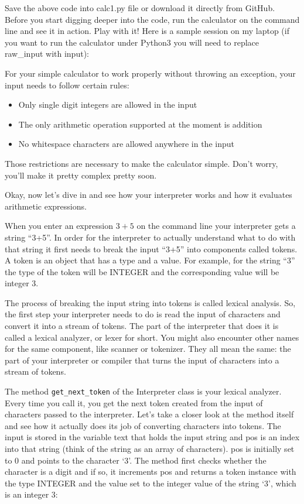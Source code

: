 Save the above code into calc1.py file or download it directly from GitHub.
Before you start digging deeper into the code, run the calculator on the command
line and see it in action. Play with it! Here is a sample session on my laptop
(if you want to run the calculator under Python3 you will need to replace
raw\_input with input):

For your simple calculator to work properly without throwing an exception, your
input needs to follow certain rules:
\begin{itemize}[nosep]
  \item 
Only single digit integers are allowed in the input
  \item 
The only arithmetic operation supported at the moment is addition
  \item 
No whitespace characters are allowed anywhere in the input
\end{itemize}

Those restrictions are necessary to make the calculator simple. Don’t worry,
you’ll make it pretty complex pretty soon.

Okay, now let’s dive in and see how your interpreter works and how it evaluates
arithmetic expressions.

When you enter an expression $3+5$ on the command line your interpreter gets a
string “3+5”. In order for the interpreter to actually understand what to do
with that string it first needs to break the input “3+5” into components called
tokens. A token is an object that has a type and a value. For example, for the
string “3” the type of the token will be INTEGER and the corresponding value
will be integer 3.

The process of breaking the input string into tokens is called lexical analysis.
So, the first step your interpreter needs to do is read the input of characters
and convert it into a stream of tokens. The part of the interpreter that does it
is called a lexical analyzer, or lexer for short. You might also encounter other
names for the same component, like scanner or tokenizer. They all mean the same:
the part of your interpreter or compiler that turns the input of characters into
a stream of tokens.

The method \verb|get_next_token| of the Interpreter class is your lexical
analyzer. Every time you call it, you get the next token created from the input
of characters passed to the interpreter. Let’s take a closer look at the method
itself and see how it actually does its job of converting characters into
tokens. The input is stored in the variable text that holds the input string and
pos is an index into that string (think of the string as an array of
characters). pos is initially set to 0 and points to the character ‘3’. The
method first checks whether the character is a digit and if so, it increments
pos and returns a token instance with the type INTEGER and the value set to the
integer value of the string ‘3’, which is an integer 3:

